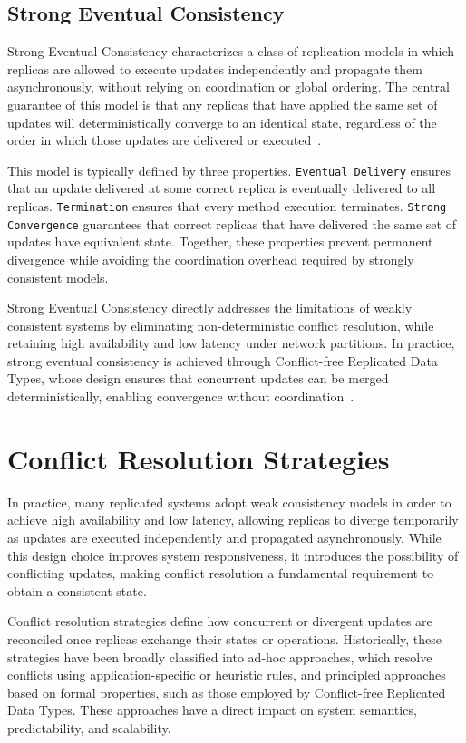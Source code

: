 \subsection{Strong Eventual Consistency}
\label{sub:sec}

Strong Eventual Consistency characterizes a class of replication models in which replicas are allowed to execute updates independently and propagate them asynchronously, without relying on coordination or global ordering. The central guarantee of this model is that any replicas that have applied the same set of updates will deterministically converge to an identical state, regardless of the order in which those updates are delivered or executed~\cite{shapiro2011comprehensive}.

This model is typically defined by three properties. \texttt{Eventual Delivery} ensures that an update delivered at some correct replica is eventually delivered to all replicas. \texttt{Termination} ensures that every method execution terminates. \texttt{Strong Convergence} guarantees that correct replicas that have delivered the same set of updates have equivalent state. Together, these properties prevent permanent divergence while avoiding the coordination overhead required by strongly consistent models.

Strong Eventual Consistency directly addresses the limitations of weakly consistent systems by eliminating non-deterministic conflict resolution, while retaining high availability and low latency under network partitions. In practice, strong eventual consistency is achieved through Conflict-free Replicated Data Types, whose design ensures that concurrent updates can be merged deterministically, enabling convergence without coordination~\cite{preguica2018overview}.

\section{Conflict Resolution Strategies}
\label{sec:conflict}

In practice, many replicated systems adopt weak consistency models in order to achieve high availability and low latency, allowing replicas to diverge temporarily as updates are executed independently and propagated asynchronously. While this design choice improves system responsiveness, it introduces the possibility of conflicting updates, making conflict resolution a fundamental requirement to obtain a consistent state.

Conflict resolution strategies define how concurrent or divergent updates are reconciled once replicas exchange their states or operations. Historically, these strategies have been broadly classified into ad-hoc approaches, which resolve conflicts using application-specific or heuristic rules, and principled approaches based on formal properties, such as those employed by Conflict-free Replicated Data Types. These approaches have a direct impact on system semantics, predictability, and scalability.

